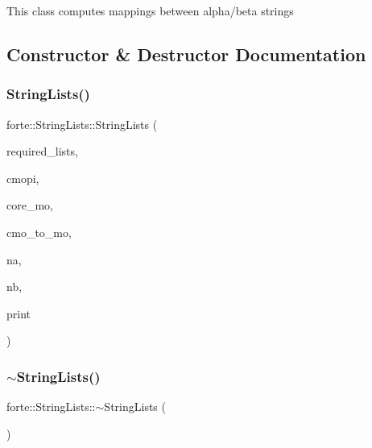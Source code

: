 This class computes mappings between alpha/beta strings 

\subsection{Constructor \& Destructor Documentation}
\mbox{\label{classforte_1_1_string_lists_a9b4afa2c5e5252c985e90328464322ca}} 
\subsubsection{\texorpdfstring{String\+Lists()}{StringLists()}}
{\footnotesize\ttfamily forte\+::\+String\+Lists\+::\+String\+Lists (\begin{DoxyParamCaption}\item[{\mbox{\hyperlink{namespaceforte_a0adc3919f741515031673b80ab77f2c7}{Required\+Lists}}}]{required\+\_\+lists,  }\item[{psi\+::\+Dimension}]{cmopi,  }\item[{std\+::vector$<$ size\+\_\+t $>$}]{core\+\_\+mo,  }\item[{std\+::vector$<$ size\+\_\+t $>$}]{cmo\+\_\+to\+\_\+mo,  }\item[{size\+\_\+t}]{na,  }\item[{size\+\_\+t}]{nb,  }\item[{int}]{print }\end{DoxyParamCaption})}

\mbox{\label{classforte_1_1_string_lists_ad1ce86d38dcc5f4ded2070b18eafd644}} 
\subsubsection{\texorpdfstring{$\sim$\+String\+Lists()}{~StringLists()}}
{\footnotesize\ttfamily forte\+::\+String\+Lists\+::$\sim$\+String\+Lists (\begin{DoxyParamCaption}{ }\end{DoxyParamCaption})\hspace{0.3cm}{\ttfamily [inline]}}



